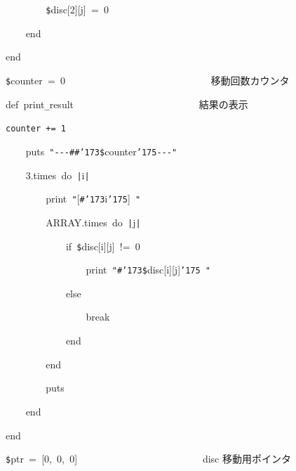 \documentclass{article}
\begin{document}
\noindent
\mbox{}{\tt\mc \ \ \ \ \ \ \ \ }{\tt\$}disc[2][j]{\tt\mc \ }={\tt\mc \ }0

\noindent
\mbox{}{\tt\mc \ \ \ \ }end

\noindent
\mbox{}end

\noindent
\mbox{}\hfill

\noindent
\mbox{}{\tt\$}counter{\tt\mc \ }={\tt\mc \ }0{\tt\mc \ \ \ \ \ \ \ \ \ \ \ \ \ \ \ \ \ \ \ \ \ \ \ \ \ \ \ \ }\rm\mc {\tt\#}\  {}移動回数カウンタ \hfill  \rm\mc 

\noindent
\mbox{}\tt\mc \hfill

\noindent
\mbox{}def{\tt\mc \ }print{\tt\_}result{\tt\mc \ \ \ \ \ \ \ \ \ \ \ \ \ \ \ \ \ \ \ \ \ \ \ \ }\rm\mc {\tt\#}\  {}結果の表示 \hfill  \rm\mc 

\noindent
\mbox{}\tt\mc {\tt\mc \ \ \ \ }{\tt\$}counter{\tt\mc \ }+={\tt\mc \ }1

\noindent
\mbox{}{\tt\mc \ \ \ \ }puts{\tt\mc \ }{\tt "}{\tt -}{\tt -}{\tt -}{\tt\#}{\tt\#}{\tt\char'173}{\tt\$}counter{\tt\char'175}{\tt -}{\tt -}{\tt -}{\tt "}

\noindent
\mbox{}{\tt\mc \ \ \ \ }3.times{\tt\mc \ }do{\tt\mc \ }{\tt |}i{\tt |}

\noindent
\mbox{}{\tt\mc \ \ \ \ \ \ \ \ }print{\tt\mc \ }{\tt "}[{\tt\#}{\tt\char'173}i{\tt\char'175}]{\tt\mc \ }{\tt "}

\noindent
\mbox{}{\tt\mc \ \ \ \ \ \ \ \ }ARRAY.times{\tt\mc \ }do{\tt\mc \ }{\tt |}j{\tt |}

\noindent
\mbox{}{\tt\mc \ \ \ \ \ \ \ \ \ \ \ \ }if{\tt\mc \ }{\tt\$}disc[i][j]{\tt\mc \ }!={\tt\mc \ }0

\noindent
\mbox{}{\tt\mc \ \ \ \ \ \ \ \ \ \ \ \ \ \ \ \ }print{\tt\mc \ }{\tt "}{\tt\#}{\tt\char'173}{\tt\$}disc[i][j]{\tt\char'175}{\tt\mc \ }{\tt "}

\noindent
\mbox{}{\tt\mc \ \ \ \ \ \ \ \ \ \ \ \ }else

\noindent
\mbox{}{\tt\mc \ \ \ \ \ \ \ \ \ \ \ \ \ \ \ \ }break

\noindent
\mbox{}{\tt\mc \ \ \ \ \ \ \ \ \ \ \ \ }end

\noindent
\mbox{}{\tt\mc \ \ \ \ \ \ \ \ }end

\noindent
\mbox{}{\tt\mc \ \ \ \ \ \ \ \ }puts

\noindent
\mbox{}{\tt\mc \ \ \ \ }end

\noindent
\mbox{}end

\noindent
\mbox{}\hfill

\noindent
\mbox{}{\tt\$}ptr{\tt\mc \ }={\tt\mc \ }[0,{\tt\mc \ }0,{\tt\mc \ }0]{\tt\mc \ \ \ \ \ \ \ \ \ \ \ \ \ \ \ \ \ \ \ \ \ \ \ \ }\rm\mc {\tt\#}\  {}disc 移動用ポインタ \hfill  \rm\mc 
\end{document}
